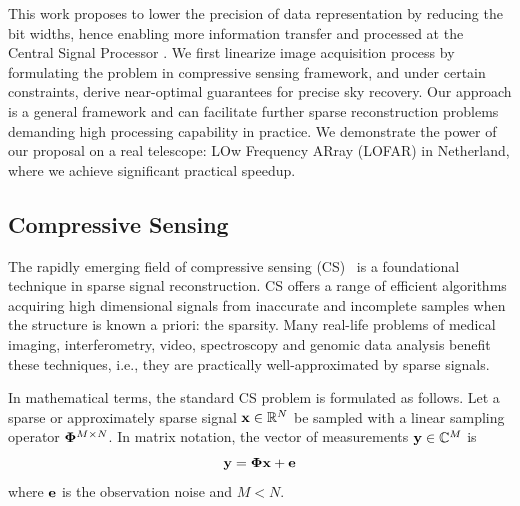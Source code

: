 \documentclass{article}
\begin{document}
This work proposes to lower the precision of data representation by reducing the bit widths, hence enabling more information transfer and processed at the Central Signal Processor \cite{rik2016ska}. We first linearize image acquisition process by formulating the problem in compressive sensing framework, and under certain constraints, derive near-optimal guarantees for precise sky recovery. Our approach is a general framework and can facilitate further sparse reconstruction problems demanding high processing capability in practice. We demonstrate the power of our proposal on a real telescope: LOw Frequency ARray (LOFAR) in Netherland, where we achieve significant practical speedup.


\subsection{Compressive Sensing}
The rapidly emerging field of compressive sensing (CS)~\cite{donoho2006cs, candes2006cs, candes2006cs2} is a foundational technique in sparse signal reconstruction. CS offers a range of efficient algorithms acquiring high dimensional signals from inaccurate and incomplete samples when the structure is known a priori: the sparsity. Many real-life problems of medical imaging, interferometry, video, spectroscopy and genomic data analysis  benefit these techniques, i.e., they are practically well-approximated by sparse signals.

In mathematical terms, the standard CS problem is formulated as follows. Let a sparse or approximately sparse signal ${\bf x}\in \mathbb{R}^N$ be sampled with a linear sampling operator ${\bf \Phi}^{M\times N}$. In matrix notation, the vector of measurements ${\bf y} \in \mathbb{C}^M$ is
\begin{equation}
 {\bf y} =  {\bf \Phi}  {\bf x} + {\bf e}
\end{equation}
where ${\bf e}$ is the observation noise and $M < N$.
\end{document}

